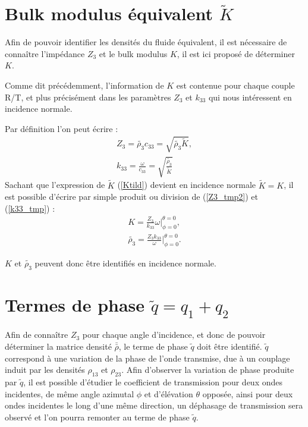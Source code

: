 \documentclass[12pt]{report}
\begin{document}
\section{Bulk modulus équivalent $\tilde{K}$}
\label{Ch_Inv_S_K}
Afin de pouvoir identifier les densités du fluide équivalent, il est nécessaire de connaître l'impédance $Z_3$  et le bulk modulus $K$, il est ici proposé de déterminer $K$.
    
    Comme dit précédemment, l'information de $K$ est contenue pour chaque couple R/T, et plus précisément dans les paramètres $Z_3$ et $k_{33}$ qui nous intéressent en incidence normale.
    
    Par définition l'on peut écrire :
    \begin{align}
        Z_3=\tilde{\rho_3}c_{33}=\sqrt{\tilde{\rho_3}\tilde{K}},\label{Z3_tmp2}\\
        k_{33}=\frac{\omega}{c_{33}}=\sqrt{\frac{\tilde{\rho_3}}{\tilde{K}}}\label{k33_tmp}
    \end{align}
    Sachant que l'expression de $\tilde{K}$ (\ref{Ktild}) devient en incidence normale $\tilde{K}=K$, il est possible d'écrire par simple produit ou division de (\ref{Z3_tmp2}) et (\ref{k33_tmp}) :
    \begin{align}
        K=\frac{Z_3}{k_{33}}\omega|^{\theta=0}_{\phi=0},\label{K}\\
        \tilde{\rho_3}=\frac{Z_3k_{33}}{\omega}|^{\theta=0}_{\phi=0}.\label{rho3tild_id}
    \end{align}
    
    $K$ et $\tilde{\rho_3}$ peuvent donc être identifiés en incidence normale.

\section{Termes de phase $\tilde{q}=q_1+q_2$}
\label{Ch_Inv_S_q}
    Afin de connaître $Z_3$ pour chaque angle d'incidence, et donc de pouvoir déterminer la matrice densité $\bar{\bar{\rho}}$, le terme de phase $\tilde{q}$ doit être identifié. $\tilde{q}$ correspond à une variation de la phase de l'onde transmise, due à un couplage induit par les densités $\rho_{13}$ et $\rho_{23}$. Afin d'observer la variation de phase produite par $\tilde{q}$, il est possible d'étudier le coefficient de transmission pour deux ondes incidentes, de même angle azimutal $\phi$ et d'élévation $\theta $ opposée, ainsi pour deux ondes incidentes le long d'une même direction, un déphasage de transmission sera observé et l'on pourra remonter au terme de phase $\tilde{q}$.
    
\end{document}
